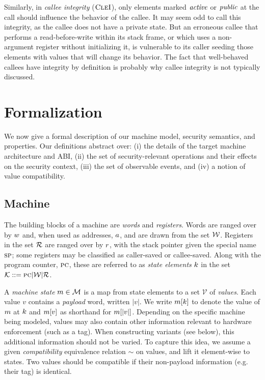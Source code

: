 \documentclass[10pt,conference]{ieeetran}%
\theoremstyle{definition}
\begin{document}
Similarly, in \emph{callee integrity} (\(\textnormal{\sc CleI}\)), only elements marked \(\mathit{active}\)
or \(\mathit{public}\) at the call should influence the behavior of the callee. It may seem
odd to call this integrity, as the callee does not have a private state. But
an erroneous callee that performs a read-before-write within its stack
frame, or which uses a non-argument register without initializing it, is vulnerable
to its caller seeding those elements with values that will change its behavior.
The fact that well-behaved callees have integrity by definition is probably why
callee integrity is not typically discussed.

\section{Formalization}
\label{sec:formal}

We now give a formal description of our machine model, security semantics,
and properties. Our definitions abstract over: (i) the details of  the target machine
architecture and ABI, (ii) the set of security-relevant operations and their effects on
the security context, (iii) the set of observable events, and (iv) a notion of value compatibility.

\subsection{Machine}
The building blocks of a machine are {\em words} and {\em registers}.
Words are ranged over by \(w\) and, when used as addresses, \(a\),
and are drawn from the set \({\mathcal W}\).
Registers in the set \({\mathcal R}\) are ranged over by \(r\), with the stack pointer
given the special name \(\textsc{sp}\);
some registers may be classified as caller-saved or callee-saved.
Along with the program counter, \(\textsc{pc}\), these are referred to as
{\em state elements} \(k\) in the set \({\mathcal K} ::= \textsc{pc} | {\mathcal W} | {\mathcal R}\).

A {\em machine state} \(m \in {\mathcal M}\) is a map from state elements to a set \(\mathcal{V}\) of
\emph{values}.
Each value \(v\) contains a \emph{payload} word, written \(|v|\).
We write \(m[k]\) to denote the value of \(m\) at
\(k\)  and \(m[v]\) as shorthand for \(m[|v|]\).
Depending on the specific machine being modeled, values may also contain other
information relevant to hardware enforcement (such as a tag). 
When constructing variants (see below), this additional information should
not be varied. To capture this idea, we assume a given \emph{compatibility} equivalence relation \(\sim\) on values,
and lift it element-wise to states.  Two values should be compatible if their
non-payload information (e.g. their tag) is identical.
\end{document}

